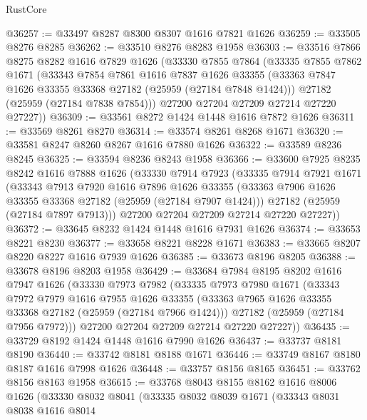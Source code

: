 \begin{lexlean}{RustCore}
\begin{coremodule}
@36257 := @33497 @8287 @8300 @8307 @1616 @7821 @1626
@36259 := @33505 @8276 @8285
@36262 := @33510 @8276 @8283 @1958
@36303 := @33516
    @7866
    @8275
    @8282
    @1616
    @7829
    @1626
    (@33330
      @7855
      @7864
      (@33335
        @7855
        @7862
        @1671
        (@33343
          @7854
          @7861
          @1616
          @7837
          @1626
          @33355
          (@33363 @7847 @1626 @33355 @33368 @27182 (@25959 (@27184 @7848 @1424)))
          @27182
          (@25959 (@27184 @7838 @7854)))
        @27200
        @27204
        @27209
        @27214
        @27220
        @27227))
@36309 := @33561 @8272 @1424 @1448 @1616 @7872 @1626
@36311 := @33569 @8261 @8270
@36314 := @33574 @8261 @8268 @1671
@36320 := @33581 @8247 @8260 @8267 @1616 @7880 @1626
@36322 := @33589 @8236 @8245
@36325 := @33594 @8236 @8243 @1958
@36366 := @33600
    @7925
    @8235
    @8242
    @1616
    @7888
    @1626
    (@33330
      @7914
      @7923
      (@33335
        @7914
        @7921
        @1671
        (@33343
          @7913
          @7920
          @1616
          @7896
          @1626
          @33355
          (@33363 @7906 @1626 @33355 @33368 @27182 (@25959 (@27184 @7907 @1424)))
          @27182
          (@25959 (@27184 @7897 @7913)))
        @27200
        @27204
        @27209
        @27214
        @27220
        @27227))
@36372 := @33645 @8232 @1424 @1448 @1616 @7931 @1626
@36374 := @33653 @8221 @8230
@36377 := @33658 @8221 @8228 @1671
@36383 := @33665 @8207 @8220 @8227 @1616 @7939 @1626
@36385 := @33673 @8196 @8205
@36388 := @33678 @8196 @8203 @1958
@36429 := @33684
    @7984
    @8195
    @8202
    @1616
    @7947
    @1626
    (@33330
      @7973
      @7982
      (@33335
        @7973
        @7980
        @1671
        (@33343
          @7972
          @7979
          @1616
          @7955
          @1626
          @33355
          (@33363 @7965 @1626 @33355 @33368 @27182 (@25959 (@27184 @7966 @1424)))
          @27182
          (@25959 (@27184 @7956 @7972)))
        @27200
        @27204
        @27209
        @27214
        @27220
        @27227))
@36435 := @33729 @8192 @1424 @1448 @1616 @7990 @1626
@36437 := @33737 @8181 @8190
@36440 := @33742 @8181 @8188 @1671
@36446 := @33749 @8167 @8180 @8187 @1616 @7998 @1626
@36448 := @33757 @8156 @8165
@36451 := @33762 @8156 @8163 @1958
@36615 := @33768
    @8043
    @8155
    @8162
    @1616
    @8006
    @1626
    (@33330
      @8032
      @8041
      (@33335
        @8032
        @8039
        @1671
        (@33343
          @8031
          @8038
          @1616
          @8014

\end{coremodule}
\end{lexlean}

